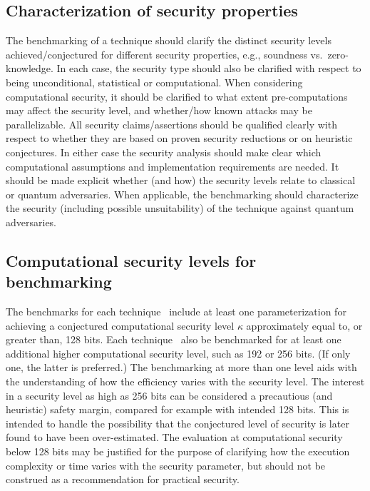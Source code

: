 \def\tmpTitle{Characterization of security properties}
\subsection[\tmpTitle]{\tmpTitle{}}
\label{security:efficiency:characterize-properties}
	The benchmarking of a technique should clarify the distinct security levels achieved/conjectured for different security properties, e.g., soundness vs.\ zero-knowledge.
	In each case, the security type should also be clarified with respect to being unconditional, statistical or computational.
	When considering computational security, it should be clarified to what extent pre-computations may affect the security level, and whether/how known attacks may be parallelizable.
	All security claims/assertions should be qualified clearly with respect to whether they are based on proven security reductions or on heuristic conjectures. 
    In either case the security analysis should make clear which computational assumptions and implementation requirements are needed. 
    It should be made explicit whether (and how) the security levels relate to classical or quantum adversaries. 
    When applicable, the benchmarking should characterize the security (including possible unsuitability) of the technique against quantum adversaries.



\def\tmpTitle{Computational security levels for benchmarking}
\subsection[\tmpTitle]{\tmpTitle{}}
\label{security:efficiency:comp-sec-levels}

	The benchmarks for each technique \shall\ include at least one parameterization 
for achieving a conjectured computational security level $\kappa$ approximately equal to, or greater than, 128 bits.
	Each technique \should\ also be benchmarked for at least one 
additional higher computational security level, such as 192 or 256 bits.
    (If only one, the latter is preferred.)
    The benchmarking at more than one level aids with the understanding of how
the efficiency varies with the security level.
    The interest in a security level as high as 256 bits can be considered a 
precautious (and heuristic) safety margin, compared for example with intended 128 bits.
    This is intended to handle the possibility that the conjectured level of security is later found to have been over-estimated.
	The evaluation at computational security below 128 bits may be justified for the purpose 
of clarifying how the execution complexity or time varies with the security parameter, 
but should not be construed as a recommendation for practical security.


